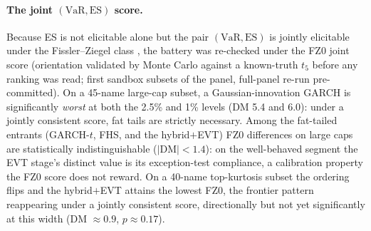 \documentclass[11pt]{article}
\newcommand{\VaR}{\mathrm{VaR}}
\newcommand{\ES}{\mathrm{ES}}
\theoremstyle{remark}
\begin{document}
\paragraph{The joint $(\VaR,\ES)$ score.} Because ES is not elicitable
alone but the pair $(\VaR,\ES)$ is jointly elicitable under the
Fissler--Ziegel class \citep{fissler2016}, the battery was re-checked
under the FZ0 joint score (orientation validated by Monte Carlo against
a known-truth $t_5$ before any ranking was read; first sandbox subsets
of the panel, full-panel re-run pre-committed). On a
45-name large-cap subset, a Gaussian-innovation GARCH is significantly
\emph{worst} at both the 2.5\% and 1\% levels (DM 5.4 and 6.0): under a
jointly consistent score, fat tails are strictly necessary. Among the fat-tailed entrants (GARCH-$t$, FHS, and the hybrid$+$EVT) FZ0 differences on large caps are statistically indistinguishable
($|$DM$|<1.4$): on the well-behaved segment the EVT stage's distinct
value is its exception-test compliance, a calibration property the FZ0
score does not reward. On a 40-name top-kurtosis subset the ordering
flips and the hybrid$+$EVT attains the lowest FZ0, the frontier pattern reappearing under a jointly consistent score, directionally but not yet significantly at this width (DM $\approx 0.9$,
$p \approx 0.17$).
\end{document}
